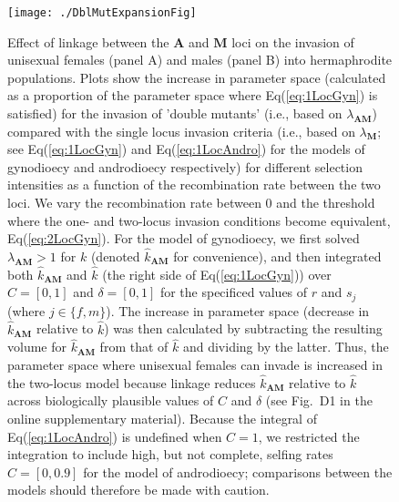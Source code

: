 \documentclass{article}
\begin{document}
{\begin{figure}[htbp]
\centering
\texttt{[image: ./DblMutExpansionFig]}
\caption{Effect of linkage between the $\mathbf{A}$ and $\mathbf{M}$ loci on the invasion of unisexual females (panel A) and males (panel B) into hermaphrodite populations. Plots show the increase in parameter space (calculated as a proportion of the parameter space where Eq(\ref{eq:1LocGyn}) is satisfied) for the invasion of 'double mutants' (i.e., based on $\lambda_{\mathbf{AM}}$) compared with the single locus invasion criteria (i.e., based on $\lambda_{\mathbf{M}}$; see Eq(\ref{eq:1LocGyn}) and Eq(\ref{eq:1LocAndro}) for the models of gynodioecy and androdioecy respectively) for different selection intensities as a function of the recombination rate between the two loci. We vary the recombination rate between $0$ and the threshold where the one- and two-locus invasion conditions become equivalent, Eq(\ref{eq:2LocGyn}). For the model of gynodioecy, we first solved $\lambda_{\mathbf{AM}} > 1$ for $k$ (denoted $\hat{k}_{\mathbf{AM}}$ for convenience), and then integrated both $\hat{k}_{\mathbf{AM}}$ and $\hat{k}$ (the right side of Eq(\ref{eq:1LocGyn})) over $C = [0,1]$ and $\delta = [0,1]$ for the specificed values of $r$ and $s_j$ (where $j \in \{f,m\}$). The increase in parameter space (decrease in $\hat{k}_{\mathbf{AM}}$ relative to $\hat{k}$) was then calculated by subtracting the resulting volume for $\hat{k}_{\mathbf{AM}}$ from that of $\hat{k}$ and dividing by the latter. Thus, the parameter space where unisexual females can invade is increased in the two-locus model because linkage reduces $\hat{k}_{\mathbf{AM}}$ relative to $\hat{k}$ across biologically plausible values of $C$ and $\delta$ (see Fig.~D1 in the online supplementary material). Because the integral of Eq(\ref{eq:1LocAndro}) is undefined when $C = 1$, we restricted the integration to include high, but not complete, selfing rates $C = [0, 0.9]$ for the model of androdioecy; comparisons between the models should therefore be made with caution.}
\label{fig:dblMutExpFig}
\end{figure}
\newpage{}

}
\end{document}
